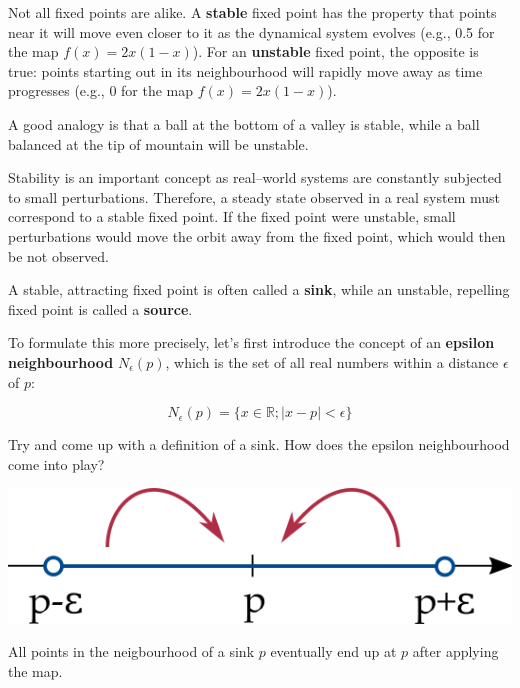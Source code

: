 \pagebreak


Not all fixed points are alike. A \textbf{stable} fixed point has the property that points near it will move even closer to it as the dynamical system evolves (e.g., 0.5 for the map $f(x)=2x(1-x)$). For an \textbf{unstable} fixed point, the opposite is true: points starting out in its neighbourhood will rapidly move away as time progresses (e.g., 0 for the map $f(x)=2x(1-x)$).

A good analogy is that a ball at the bottom of a valley is stable, while a ball balanced at the tip of mountain will be unstable.

Stability is an important concept as real--world systems are constantly subjected to small perturbations. Therefore, a steady state observed in a real system must correspond to a stable fixed point. If the fixed point were unstable, small perturbations would move the orbit away from the fixed point, which would then be not observed.

A stable, attracting fixed point is often called a \textbf{sink}, while an unstable, repelling fixed point is called a \textbf{source}.

To formulate this more precisely, let's first introduce the concept of an \textbf{epsilon neighbourhood} $N_\epsilon(p)$, which is the set of all real numbers within a distance $\epsilon$ of $p$:

\begin{equation}
N_\epsilon(p) = \{x \in \mathbb{R} ; |x-p| < \epsilon\}
\end{equation} 

\begin{cue}
Try and come up with a definition of a sink. How does the epsilon neighbourhood come into play? 
\end{cue}

\begin{marginfigure}
\centering
\includegraphics{dynamic/figures/sink}
\caption{All points in the neigbourhood of a sink $p$ eventually end up at $p$ after applying the map.}
\label{fig-sink}
\end{marginfigure}

